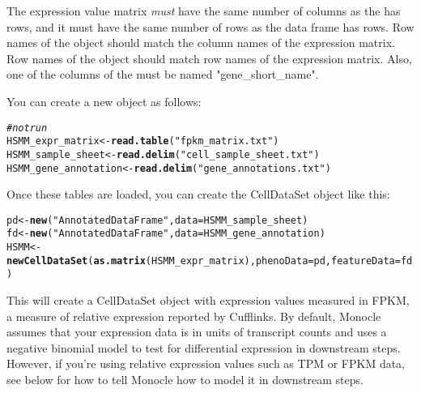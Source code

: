 \documentclass[10pt,oneside]{article}\usepackage[]{graphicx}\usepackage[]{color}
\makeatletter
\newcommand{\hlstr}[1]{\textcolor[rgb]{0.192,0.494,0.8}{#1}}%
\newcommand{\hlcom}[1]{\textcolor[rgb]{0.678,0.584,0.686}{\textit{#1}}}%
\newcommand{\hlstd}[1]{\textcolor[rgb]{0.345,0.345,0.345}{#1}}%
\newcommand{\hlkwb}[1]{\textcolor[rgb]{0.69,0.353,0.396}{#1}}%
\newcommand{\hlkwc}[1]{\textcolor[rgb]{0.333,0.667,0.333}{#1}}%
\newcommand{\hlkwd}[1]{\textcolor[rgb]{0.737,0.353,0.396}{\textbf{#1}}}%
\newenvironment{kframe}{%
 \def\at@end@of@kframe{}%
 \ifinner\ifhmode%
  \def\at@end@of@kframe{\end{minipage}}%
  \begin{minipage}{\columnwidth}%
 \fi\fi%
 \def\FrameCommand##1{\hskip\@totalleftmargin \hskip-\fboxsep
 \colorbox{shadecolor}{##1}\hskip-\fboxsep
     \hskip-\linewidth \hskip-\@totalleftmargin \hskip\columnwidth}%
 \MakeFramed {\advance\hsize-\width
   \@totalleftmargin\z@ \linewidth\hsize
   \@setminipage}}%
 {\par\unskip\endMakeFramed%
 \at@end@of@kframe}
\newenvironment{knitrout}{}{} %
\makeatother
\begin{document}
 The expression value matrix \emph{must} have the same number of columns as the  has rows, and it must have the same number of rows as the  data frame has rows. Row names of the  object should match the column names of the expression matrix. Row names of the  object should match row names of the expression matrix. Also, one of the columns of the 
  must be named "gene\_short\_name".
 
 You can create a new  object as follows:  
 
\begin{knitrout}
\color{fgcolor}\begin{kframe}
\begin{alltt}
\hlcom{#not run}
\hlstd{HSMM_expr_matrix} \hlkwb{<-} \hlkwd{read.table}\hlstd{(}\hlstr{"fpkm_matrix.txt"}\hlstd{)}
\hlstd{HSMM_sample_sheet} \hlkwb{<-} \hlkwd{read.delim}\hlstd{(}\hlstr{"cell_sample_sheet.txt"}\hlstd{)}
\hlstd{HSMM_gene_annotation} \hlkwb{<-} \hlkwd{read.delim}\hlstd{(}\hlstr{"gene_annotations.txt"}\hlstd{)}
\end{alltt}
\end{kframe}
\end{knitrout}
 
 Once these tables are loaded, you can create the CellDataSet object like this:
 
\begin{knitrout}
\color{fgcolor}\begin{kframe}
\begin{alltt}
\hlstd{pd} \hlkwb{<-} \hlkwd{new}\hlstd{(}\hlstr{"AnnotatedDataFrame"}\hlstd{,} \hlkwc{data} \hlstd{= HSMM_sample_sheet)}
\hlstd{fd} \hlkwb{<-} \hlkwd{new}\hlstd{(}\hlstr{"AnnotatedDataFrame"}\hlstd{,} \hlkwc{data} \hlstd{= HSMM_gene_annotation)}
\hlstd{HSMM} \hlkwb{<-} \hlkwd{newCellDataSet}\hlstd{(}\hlkwd{as.matrix}\hlstd{(HSMM_expr_matrix),} \hlkwc{phenoData} \hlstd{= pd,} \hlkwc{featureData} \hlstd{= fd)}
\end{alltt}
\end{kframe}
\end{knitrout}
 
This will create a CellDataSet object with expression values measured in FPKM, a measure of relative expression reported by Cufflinks. By default, Monocle assumes that your expression data is in units of transcript counts and uses a negative binomial model to test for differential expression in downstream steps. However, if you're using relative expression values such as TPM or FPKM data, see below for how to tell Monocle how to model it in downstream steps.
\end{document}
